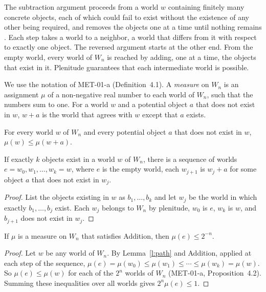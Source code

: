 \documentclass{situationist-preprint}
\begin{document}
The subtraction argument proceeds from a world $w$ containing finitely many concrete objects, each of which could fail to exist without the existence of any other being required, and removes the objects one at a time until nothing remains \citep{Baldwin1996,RodriguezPereyra1997}. Each step takes a world to a neighbor, a world that differs from it with respect to exactly one object. The reversed argument starts at the other end. From the empty world, every world of $W_n$ is reached by adding, one at a time, the objects that exist in it. Plenitude guarantees that each intermediate world is possible.

We use the notation of MET-01-a (Definition~4.1). A \emph{measure} on $W_n$ is an assignment $\mu$ of a non-negative real number to each world of $W_n$, such that the numbers sum to one. For a world $w$ and a potential object $a$ that does not exist in $w$, $w + a$ is the world that agrees with $w$ except that $a$ exists.

\begin{principle}[Addition]\label{p:add}
For every world $w$ of $W_n$ and every potential object $a$ that does not exist in $w$, $\mu(w) \leq \mu(w + a)$.
\end{principle}

\begin{lemma}\label{l:path}
If exactly $k$ objects exist in a world $w$ of $W_n$, there is a sequence of worlds $e = w_0, w_1, \ldots, w_k = w$, where $e$ is the empty world, each $w_{j+1}$ is $w_j + a$ for some object $a$ that does not exist in $w_j$.
\end{lemma}

\begin{proof}
List the objects existing in $w$ as $b_1, \ldots, b_k$ and let $w_j$ be the world in which exactly $b_1, \ldots, b_j$ exist. Each $w_j$ belongs to $W_n$ by plenitude, $w_0$ is $e$, $w_k$ is $w$, and $b_{j+1}$ does not exist in $w_j$.
\end{proof}

\begin{theorem}\label{t:bound}
If $\mu$ is a measure on $W_n$ that satisfies Addition, then $\mu(e) \leq 2^{-n}$.
\end{theorem}

\begin{proof}
Let $w$ be any world of $W_n$. By Lemma~\ref{l:path} and Addition, applied at each step of the sequence, $\mu(e) = \mu(w_0) \leq \mu(w_1) \leq \cdots \leq \mu(w_k) = \mu(w)$. So $\mu(e) \leq \mu(w)$ for each of the $2^n$ worlds of $W_n$ (MET-01-a, Proposition~4.2). Summing these inequalities over all worlds gives $2^n \mu(e) \leq 1$.
\end{proof}
\end{document}
